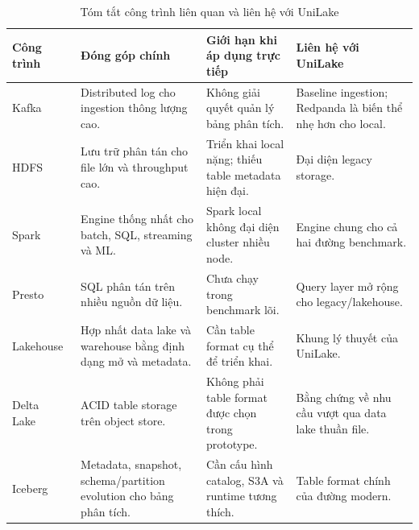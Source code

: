 \begin{table}[htbp]
\centering
\caption{Tóm tắt công trình liên quan và liên hệ với UniLake}
\label{tab:related-work}
\begin{tabularx}{\textwidth}{p{}X X X}
\toprule
Công trình & Đóng góp chính & Giới hạn khi áp dụng trực tiếp & Liên hệ với UniLake \\
\midrule
Kafka~\cite{kafkaPaper} & Distributed log cho ingestion thông lượng cao. & Không giải quyết quản lý bảng phân tích. & Baseline ingestion; Redpanda là biến thể nhẹ hơn cho local. \\
HDFS~\cite{hdfsPaper} & Lưu trữ phân tán cho file lớn và throughput cao. & Triển khai local nặng; thiếu table metadata hiện đại. & Đại diện legacy storage. \\
Spark~\cite{rddPaper,sparkCacm} & Engine thống nhất cho batch, SQL, streaming và ML. & Spark local không đại diện cluster nhiều node. & Engine chung cho cả hai đường benchmark. \\
Presto~\cite{prestoPaper} & SQL phân tán trên nhiều nguồn dữ liệu. & Chưa chạy trong benchmark lõi. & Query layer mở rộng cho legacy/lakehouse. \\
Lakehouse~\cite{lakehousePaper} & Hợp nhất data lake và warehouse bằng định dạng mở và metadata. & Cần table format cụ thể để triển khai. & Khung lý thuyết của UniLake. \\
Delta Lake~\cite{deltaLakePaper} & ACID table storage trên object store. & Không phải table format được chọn trong prototype. & Bằng chứng về nhu cầu vượt qua data lake thuần file. \\
Iceberg~\cite{icebergSpec,icebergSparkWrites} & Metadata, snapshot, schema/partition evolution cho bảng phân tích. & Cần cấu hình catalog, S3A và runtime tương thích. & Table format chính của đường modern. \\
\bottomrule
\end{tabularx}
\end{table}
